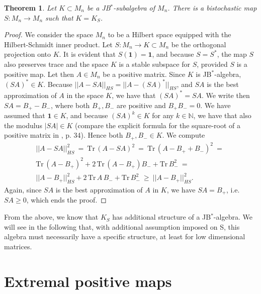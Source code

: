 \documentclass[12pt]{article}
\theoremstyle{plain}
\newtheorem{theorem}{Theorem}
\theoremstyle{definition}
\theoremstyle{remark}
\numberwithin{equation}{section}
\begin{document}
\begin{theorem}
\label{thm:FromESbook}
Let $K \subset M_{n}$ be a JB$^{*}$-subalgebra of $M_{n}$.
There is a bistochastic map
$S \! : M_{n} \rightarrow M_{n}$ such that $K = K_{S}$.
\end{theorem}
\begin{proof}
We consider the space $M_{n}$ to be a Hilbert space equipped
with the Hilbert-Schmidt inner product.
Let $S\!: M_{n} \rightarrow K \subset M_{n}$ be the 
orthogonal projection onto $K$.
It is evident that $S(\mathbf{1}) = \mathbf{1}$,
and because $S = S^{*}$, 
the map $S$ also preserves trace and
the space $K$ is a stable subspace for $S$,
provided $S$ is a positive map.
Let then $A \in M_{n}$ be a positive matrix.
Since $K$ is JB$^{*}$-algebra,
$(SA)^{*} \in K$.
Because 
$|| A - SA ||_{HS} = || A - (SA)^{*} ||_{HS}$,
and $SA$ is the best approximation of $A$ in the space $K$,
we have that $(SA)^{*} = SA$.
We write then $SA = B_{+} - B_{-}$,
where both $B_{+}, B_{-}$ are positive and 
$B_{+} B_{-} = 0$.
We have assumed that $\mathbf{1} \in K$,
and because $(SA)^{k} \in K$ for any $k \in \mathbb{N}$,
we have that also the modulus $|S A| \in K$
(compare the explicit formula for
the square-root of a positive matrix in \cite{bratteli2003operator}, p. 34).
Hence both $B_{+}, B_{-} \in K$.
We compute
\begin{multline}
|| A - SA ||_{HS}^{2} \: = \: \text{Tr} \, ( A - SA )^{2} \: = \:
    \text{Tr} \, ( A - B_{+} + B_{-} )^{2} \: = \: \\
    \text{Tr} \, ( A - B_{+} )^{2} + 
        2 \, \text{Tr} \, ( A - B_{+} ) B_{-} + \text{Tr} \, B_{-}^{2}
            \: = \: \\
    || A - B_{+} ||_{HS}^{2} + 
        2 \, \text{Tr} \,  A \, B_{-}+ \text{Tr} \, B_{-}^{2} 
    \: \geq \: || A - B_{+} ||_{HS}^{2}.
\end{multline}
Again, since $SA$ is the best approximation of $A$ in $K$,
we have $SA = B_{+}$, i.e. $SA \geq 0$, which ends the proof.
\end{proof}

From the above,
we know that $K_{S}$ has additional structure of a JB$^{*}$-algebra.
We will see in the following that,
with additional assumption imposed on S,
this algebra must necessarily
have a specific structure,
at least for low dimensional matrices.


\section{Extremal positive maps}
\label{sec:ExtremalMaps}
\end{document}
